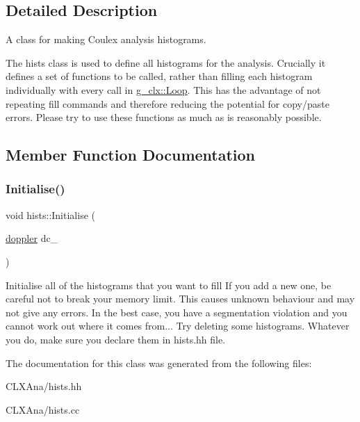 \subsection{Detailed Description}
A class for making Coulex analysis histograms. 

The hists class is used to define all histograms for the analysis. Crucially it defines a set of functions to be called, rather than filling each histogram individually with every call in \hyperlink{classg__clx_a9d5de859df4bfbb746726661ff1d24a9}{g\+\_\+clx\+::\+Loop}. This has the advantage of not repeating fill commands and therefore reducing the potential for copy/paste errors. Please try to use these functions as much as is reasonably possible. 

\subsection{Member Function Documentation}
\mbox{\label{classhists_affb3dcaefba3b63d20bbe438030e2f81}} 
\subsubsection{\texorpdfstring{Initialise()}{Initialise()}}
{\footnotesize\ttfamily void hists\+::\+Initialise (\begin{DoxyParamCaption}\item[{\hyperlink{classdoppler}{doppler}}]{dc\+\_\+ }\end{DoxyParamCaption})}

Initialise all of the histograms that you want to fill If you add a new one, be careful not to break your memory limit. This causes unknown behaviour and may not give any errors. In the best case, you have a segmentation violation and you cannot work out where it comes from... Try deleting some histograms. Whatever you do, make sure you declare them in hists.\+hh file. 

The documentation for this class was generated from the following files\+:\begin{DoxyCompactItemize}
\item 
C\+L\+X\+Ana/hists.\+hh\item 
C\+L\+X\+Ana/hists.\+cc\end{DoxyCompactItemize}
